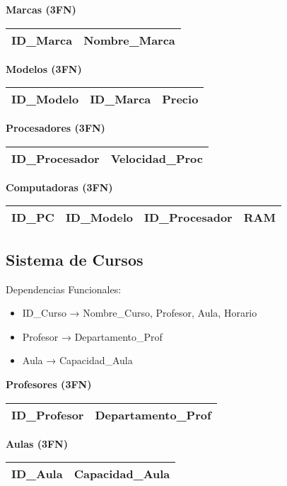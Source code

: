 \documentclass[12pt]{article}
\begin{document}
\textbf{Marcas (3FN)}
\begin{center}
\begin{tabular}{|l|l|}
\hline
ID\_Marca & Nombre\_Marca \\
\hline
\end{tabular}
\end{center}

\textbf{Modelos (3FN)}
\begin{center}
\begin{tabular}{|l|l|l|}
\hline
ID\_Modelo & ID\_Marca & Precio \\
\hline
\end{tabular}
\end{center}

\textbf{Procesadores (3FN)}
\begin{center}
\begin{tabular}{|l|l|}
\hline
ID\_Procesador & Velocidad\_Proc \\
\hline
\end{tabular}
\end{center}

\textbf{Computadoras (3FN)}
\begin{center}
\begin{tabular}{|l|l|l|l|}
\hline
ID\_PC & ID\_Modelo & ID\_Procesador & RAM \\
\hline
\end{tabular}
\end{center}

\subsection{Sistema de Cursos}

Dependencias Funcionales:
\begin{itemize}
    \item ID\_Curso → Nombre\_Curso, Profesor, Aula, Horario
    \item Profesor → Departamento\_Prof
    \item Aula → Capacidad\_Aula
\end{itemize}

\textbf{Profesores (3FN)}
\begin{center}
\begin{tabular}{|l|l|}
\hline
ID\_Profesor & Departamento\_Prof \\
\hline
\end{tabular}
\end{center}

\textbf{Aulas (3FN)}
\begin{center}
\begin{tabular}{|l|l|}
\hline
ID\_Aula & Capacidad\_Aula \\
\hline
\end{tabular}
\end{center}
\end{document}
